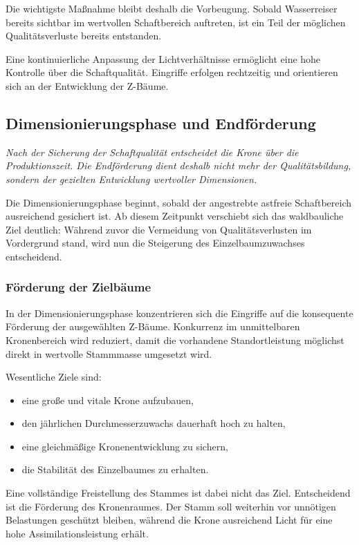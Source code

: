 \documentclass[twocolumn, bibliography=totoc, abstract=true]{scrartcl}
\begin{document}
Die wichtigste Maßnahme bleibt deshalb die Vorbeugung. Sobald Wasserreiser bereits sichtbar im wertvollen Schaftbereich auftreten, ist ein Teil der möglichen Qualitätsverluste bereits entstanden.

Eine kontinuierliche Anpassung der Lichtverhältnisse ermöglicht eine hohe Kontrolle über die Schaftqualität. Eingriffe erfolgen rechtzeitig und orientieren sich an der Entwicklung der Z-Bäume.

\subsection{Dimensionierungsphase und Endförderung}

\emph{Nach der Sicherung der Schaftqualität entscheidet die Krone über die Produktionszeit. Die Endförderung dient deshalb nicht mehr der Qualitätsbildung, sondern der gezielten Entwicklung wertvoller Dimensionen.}

Die Dimensionierungsphase beginnt, sobald der angestrebte astfreie Schaftbereich ausreichend gesichert ist. Ab diesem Zeitpunkt verschiebt sich das waldbauliche Ziel deutlich: Während zuvor die Vermeidung von Qualitätsverlusten im Vordergrund stand, wird nun die Steigerung des Einzelbaumzuwachses entscheidend.

\subsubsection{Förderung der Zielbäume}

In der Dimensionierungsphase konzentrieren sich die Eingriffe auf die konsequente Förderung der ausgewählten Z-Bäume. Konkurrenz im unmittelbaren Kronenbereich wird reduziert, damit die vorhandene Standortleistung möglichst direkt in wertvolle Stammmasse umgesetzt wird.

Wesentliche Ziele sind:

\begin{itemize}
\item eine große und vitale Krone aufzubauen,
\item den jährlichen Durchmesserzuwachs dauerhaft hoch zu halten,
\item eine gleichmäßige Kronenentwicklung zu sichern,
\item die Stabilität des Einzelbaumes zu erhalten.
\end{itemize}

Eine vollständige Freistellung des Stammes ist dabei nicht das Ziel. Entscheidend ist die Förderung des Kronenraumes. Der Stamm soll weiterhin vor unnötigen Belastungen geschützt bleiben, während die Krone ausreichend Licht für eine hohe Assimilationsleistung erhält.
\end{document}
